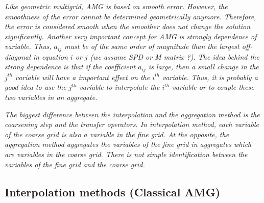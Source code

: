 \emph{Like geometric multigrid, AMG is based on smooth error. However, the
smoothness of the error cannot be determined geometrically anymore. Therefore,
the error is considered smooth when the smoother does not change the solution
significantly. Another very important concept for AMG is strongly dependence
of variable.
Thus, $a_{ij}$ must be of the same order of magnitude than the largest
off-diagonal in equation $i$ or $j$ (we assume SPD or M matrix ?). 
The idea behind the strong dependence is that if the coefficient $a_{ij}$ is
large, then a small change in the $j^{th}$ variable will have a important
effect on the $i^{th}$ variable. Thus, it is probably a good idea to use the
$j^{th}$ variable to interpolate the $i^{th}$ variable or to couple these two
variables in an aggregate.}

\emph{The biggest difference between the interpolation and the aggregation
method is the coarsening step and the transfer operators. In interpolation
method, each variable of the coarse grid is also a variable in the fine grid.
At the opposite, the aggregation method aggregates the variables of the fine
grid in aggregates which are variables in the coarse grid. There is not simple
identification between the variables of the fine grid and the coarse grid.}

\subsection{Interpolation methods (Classical AMG)}


